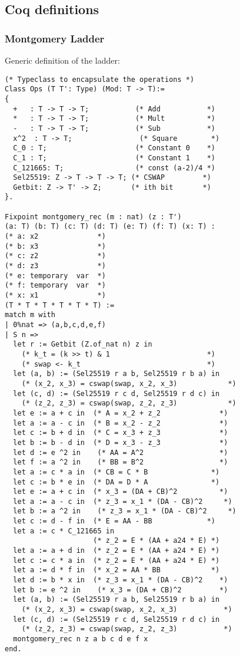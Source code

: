 \subsection{Coq definitions}
\label{appendix:coq}

\subsubsection{Montgomery Ladder}
\label{subsubsec:coq-ladder}

Generic definition of the ladder:

\begin{lstlisting}[language=Coq]
(* Typeclass to encapsulate the operations *)
Class Ops (T T': Type) (Mod: T -> T):=
{
  +   : T -> T -> T;           (* Add           *)
  *   : T -> T -> T;           (* Mult          *)
  -   : T -> T -> T;           (* Sub           *)
  x^2  : T -> T;                (* Square        *)
  C_0 : T;                     (* Constant 0    *)
  C_1 : T;                     (* Constant 1    *)
  C_121665: T;                 (* const (a-2)/4 *)
  Sel25519: Z -> T -> T -> T; (* CSWAP         *)
  Getbit: Z -> T' -> Z;       (* ith bit       *)
}.

Fixpoint montgomery_rec (m : nat) (z : T')
(a: T) (b: T) (c: T) (d: T) (e: T) (f: T) (x: T) :
(* a: x2              *)
(* b: x3              *)
(* c: z2              *)
(* d: z3              *)
(* e: temporary  var  *)
(* f: temporary  var  *)
(* x: x1              *)
(T * T * T * T * T * T) :=
match m with
| 0%nat => (a,b,c,d,e,f)
| S n =>
  let r := Getbit (Z.of_nat n) z in
    (* k_t = (k >> t) & 1                       *)
    (* swap <- k_t                              *)
  let (a, b) := (Sel25519 r a b, Sel25519 r b a) in
    (* (x_2, x_3) = cswap(swap, x_2, x_3)            *)
  let (c, d) := (Sel25519 r c d, Sel25519 r d c) in
    (* (z_2, z_3) = cswap(swap, z_2, z_3)            *)
  let e := a + c in  (* A = x_2 + z_2              *)
  let a := a - c in  (* B = x_2 - z_2              *)
  let c := b + d in  (* C = x_3 + z_3              *)
  let b := b - d in  (* D = x_3 - z_3              *)
  let d := e ^2 in    (* AA = A^2                  *)
  let f := a ^2 in    (* BB = B^2                  *)
  let a := c * a in  (* CB = C * B               *)
  let c := b * e in  (* DA = D * A               *)
  let e := a + c in  (* x_3 = (DA + CB)^2          *)
  let a := a - c in  (* z_3 = x_1 * (DA - CB)^2     *)
  let b := a ^2 in    (* z_3 = x_1 * (DA - CB)^2     *)
  let c := d - f in  (* E = AA - BB             *)
  let a := c * C_121665 in
                     (* z_2 = E * (AA + a24 * E) *)
  let a := a + d in  (* z_2 = E * (AA + a24 * E) *)
  let c := c * a in  (* z_2 = E * (AA + a24 * E) *)
  let a := d * f in  (* x_2 = AA * BB            *)
  let d := b * x in  (* z_3 = x_1 * (DA - CB)^2    *)
  let b := e ^2 in    (* x_3 = (DA + CB)^2         *)
  let (a, b) := (Sel25519 r a b, Sel25519 r b a) in
    (* (x_2, x_3) = cswap(swap, x_2, x_3)           *)
  let (c, d) := (Sel25519 r c d, Sel25519 r d c) in
    (* (z_2, z_3) = cswap(swap, z_2, z_3)           *)
  montgomery_rec n z a b c d e f x
end.


\end{lstlisting}
